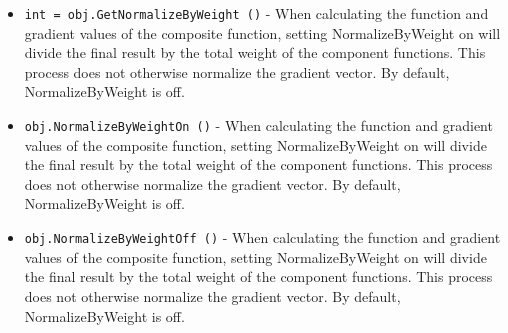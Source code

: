 \begin{itemize}
\item  \verb|int = obj.GetNormalizeByWeight ()| -  When calculating the function and gradient values of the
 composite function, setting NormalizeByWeight on will divide the
 final result by the total weight of the component functions.
 This process does not otherwise normalize the gradient vector.
 By default, NormalizeByWeight is off.

\item  \verb|obj.NormalizeByWeightOn ()| -  When calculating the function and gradient values of the
 composite function, setting NormalizeByWeight on will divide the
 final result by the total weight of the component functions.
 This process does not otherwise normalize the gradient vector.
 By default, NormalizeByWeight is off.

\item  \verb|obj.NormalizeByWeightOff ()| -  When calculating the function and gradient values of the
 composite function, setting NormalizeByWeight on will divide the
 final result by the total weight of the component functions.
 This process does not otherwise normalize the gradient vector.
 By default, NormalizeByWeight is off.

\end{itemize}
